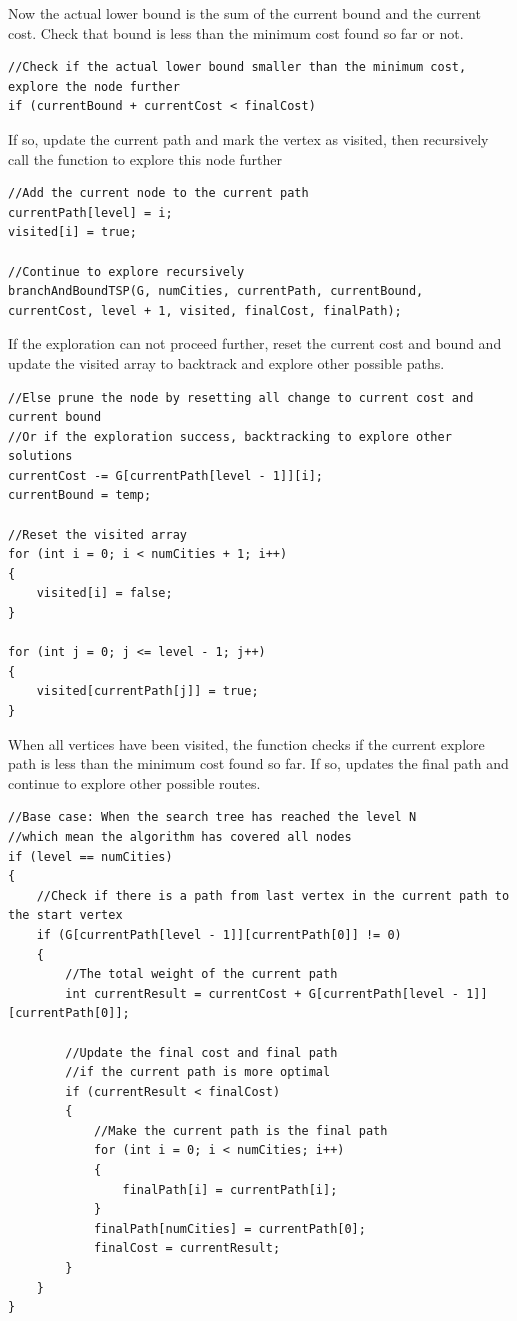 \documentclass[a4paper]{article}
\begin{document}
Now the actual lower bound is the sum of the current bound and the current cost. Check that bound is less than the minimum cost found so far or not.
\begin{verbatim}
//Check if the actual lower bound smaller than the minimum cost, explore the node further
if (currentBound + currentCost < finalCost)
\end{verbatim}    
If so, update the current path and mark the vertex as visited, then recursively call the function to explore this node further
\begin{verbatim}
//Add the current node to the current path
currentPath[level] = i;
visited[i] = true;

//Continue to explore recursively
branchAndBoundTSP(G, numCities, currentPath, currentBound, currentCost, level + 1, visited, finalCost, finalPath);
\end{verbatim}
If the exploration can not proceed further, reset the current cost and bound and update the visited array to backtrack and explore other possible paths.
\begin{verbatim}
//Else prune the node by resetting all change to current cost and current bound
//Or if the exploration success, backtracking to explore other solutions  
currentCost -= G[currentPath[level - 1]][i];
currentBound = temp;

//Reset the visited array
for (int i = 0; i < numCities + 1; i++)
{
    visited[i] = false;
}

for (int j = 0; j <= level - 1; j++)
{
    visited[currentPath[j]] = true;
}
\end{verbatim}
When all vertices have been visited, the function checks if the current explore path is less than the minimum cost found so far. If so, updates the final path and continue to explore other possible routes.
\begin{verbatim}
//Base case: When the search tree has reached the level N
//which mean the algorithm has covered all nodes
if (level == numCities)
{
    //Check if there is a path from last vertex in the current path to the start vertex
    if (G[currentPath[level - 1]][currentPath[0]] != 0)
    {
        //The total weight of the current path
        int currentResult = currentCost + G[currentPath[level - 1]][currentPath[0]];

        //Update the final cost and final path
        //if the current path is more optimal
        if (currentResult < finalCost)
        {
            //Make the current path is the final path
            for (int i = 0; i < numCities; i++)
            {
                finalPath[i] = currentPath[i];
            }
            finalPath[numCities] = currentPath[0];
            finalCost = currentResult;
        }
    }
}
\end{verbatim}
\end{document}
